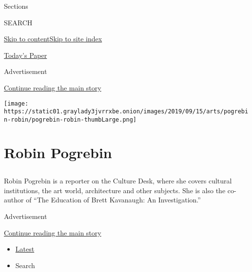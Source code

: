Sections

SEARCH

\protect\hyperlink{site-content}{Skip to
content}\protect\hyperlink{site-index}{Skip to site index}

\href{https://myaccount.nytimes3xbfgragh.onion/auth/login?response_type=cookie\&client_id=vi}{}

\href{https://www.nytimes3xbfgragh.onion/section/todayspaper}{Today's
Paper}

Advertisement

\protect\hyperlink{after-top}{Continue reading the main story}

\texttt{[image: https://static01.graylady3jvrrxbe.onion/images/2019/09/15/arts/pogrebin-robin/pogrebin-robin-thumbLarge.png]}

\hypertarget{robin-pogrebin}{%
\section{Robin Pogrebin}\label{robin-pogrebin}}

\subsection{}

Robin Pogrebin is a reporter on the Culture Desk, where she covers
cultural institutions, the art world, architecture and other subjects.
She is also the co-author of ``The Education of Brett Kavanaugh: An
Investigation.''

Advertisement

\protect\hyperlink{after-mid1}{Continue reading the main story}

\begin{itemize}
\tightlist
\item
  \protect\hyperlink{stream-panel}{Latest}
\item
  Search
\end{itemize}

